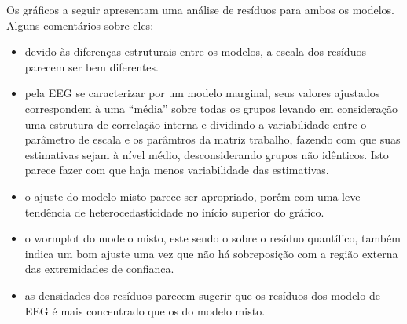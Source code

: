 \documentclass[
  11pt,
]{article}
\newenvironment{Shaded}{\begin{snugshade}}{\end{snugshade}}
\newcommand{\CommentTok}[1]{\textcolor[rgb]{0.56,0.35,0.01}{\textit{#1}}}
\newcommand{\DataTypeTok}[1]{\textcolor[rgb]{0.13,0.29,0.53}{#1}}
\newcommand{\DecValTok}[1]{\textcolor[rgb]{0.00,0.00,0.81}{#1}}
\newcommand{\KeywordTok}[1]{\textcolor[rgb]{0.13,0.29,0.53}{\textbf{#1}}}
\newcommand{\NormalTok}[1]{#1}
\newcommand{\OperatorTok}[1]{\textcolor[rgb]{0.81,0.36,0.00}{\textbf{#1}}}
\newcommand{\StringTok}[1]{\textcolor[rgb]{0.31,0.60,0.02}{#1}}
\begin{document}
\begin{Shaded}
\end{Shaded}

Os gráficos a seguir apresentam uma análise de resíduos para ambos os modelos. Alguns comentários sobre eles:

\begin{itemize}
\item
  devido às diferenças estruturais entre os modelos, a escala dos resíduos parecem ser bem diferentes.
\item
  pela EEG se caracterizar por um modelo marginal, seus valores ajustados correspondem à uma ``média'' sobre todas os grupos levando em consideração uma estrutura de correlação interna e dividindo a variabilidade entre o parâmetro de escala e os parâmtros da matriz trabalho, fazendo com que suas estimativas sejam à nível médio, desconsiderando grupos não idênticos. Isto parece fazer com que haja menos variabilidade das estimativas.
\item
  o ajuste do modelo misto parece ser apropriado, porêm com uma leve tendência de heterocedasticidade no início superior do gráfico.
\item
  o wormplot do modelo misto, este sendo o sobre o resíduo quantílico, também indica um bom ajuste uma vez que não há sobreposição com a região externa das extremidades de confianca.
\item
  as densidades dos resíduos parecem sugerir que os resíduos dos modelo de EEG é mais concentrado que os do modelo misto.
\end{itemize}
\end{document}
